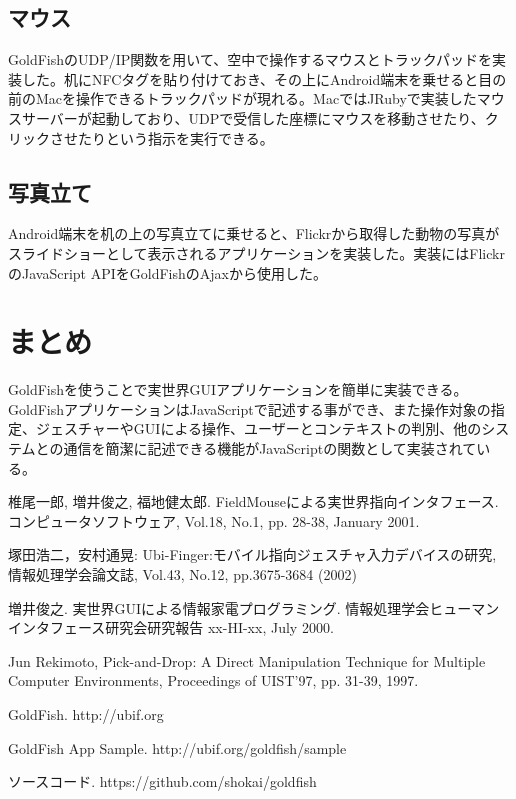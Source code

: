 \subsection{マウス}
GoldFishのUDP/IP関数を用いて、空中で操作するマウスとトラックパッドを実装した。机にNFCタグを貼り付けておき、その上にAndroid端末を乗せると目の前のMacを操作できるトラックパッドが現れる。MacではJRubyで実装したマウスサーバーが起動しており、UDPで受信した座標にマウスを移動させたり、クリックさせたりという指示を実行できる。


\subsection{写真立て}
Android端末を机の上の写真立てに乗せると、Flickrから取得した動物の写真がスライドショーとして表示されるアプリケーションを実装した。実装にはFlickrのJavaScript APIをGoldFishのAjaxから使用した。


\section{まとめ}
GoldFishを使うことで実世界GUIアプリケーションを簡単に実装できる。GoldFishアプリケーションはJavaScriptで記述する事ができ、また操作対象の指定、ジェスチャーやGUIによる操作、ユーザーとコンテキストの判別、他のシステムとの通信を簡潔に記述できる機能がJavaScriptの関数として実装されている。


\begin{thebibliography}{10}

椎尾一郎, 増井俊之, 福地健太郎. FieldMouseによる実世界指向インタフェース. コンピュータソフトウェア, Vol.18, No.1, pp. 28-38, January 2001.

塚田浩二，安村通晃: Ubi-Finger:モバイル指向ジェスチャ入力デバイスの研究, 情報処理学会論文誌, Vol.43, No.12, pp.3675-3684 (2002)

増井俊之. 実世界GUIによる情報家電プログラミング. 情報処理学会ヒューマンインタフェース研究会研究報告 xx-HI-xx, July 2000.

Jun Rekimoto, Pick-and-Drop: A Direct Manipulation Technique for Multiple Computer Environments, Proceedings of UIST'97, pp. 31-39, 1997.

GoldFish. http://ubif.org

GoldFish App Sample. http://ubif.org/goldfish/sample

ソースコード. https://github.com/shokai/goldfish

\end{thebibliography}

